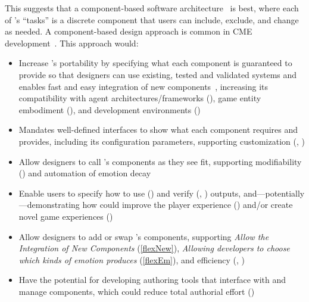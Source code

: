 This suggests that a component-based software
architecture~\citep[p.~248--261]{qian2010software} is best, where each of
\progname{}'s ``tasks'' is a discrete component that users can include,
exclude, and change as needed. A component-based design approach is common in
CME development~\citep[p.~141]{osuna2021toward}. This approach would:
\begin{itemize}
    \item Increase \progname{}'s portability by specifying what each component
    is guaranteed to provide so that designers can use existing, tested and
    validated systems and enables fast and easy integration of new
    components~\citep[p.~443]{rodriguez2015computational}, increasing its
    compatibility with agent architectures/frameworks (), game
    entity embodiment (), and development environments
    ()

    \item Mandates well-defined interfaces to show what each component requires
    and provides, including its configuration parameters, supporting
    customization (, )

    \item Allow designers to call \progname{}'s components as they see fit,
    supporting modifiability () and automation of emotion decay

    \item Enable users to specify how to use () and verify
    (, ) \progname{} outputs,
    and---potentially---demonstrating how \progname{} could improve the player
    experience () and/or create novel game experiences
    ()

    \item Allow designers to add or swap \progname{}'s components, supporting
    \textit{Allow the Integration of New Components} (\ref{flexNew}),
    \textit{Allowing developers to choose which kinds of emotion \progname{}
        produces} (\ref{flexEm}), and efficiency (,
        )~\citep[p.~466]{carbone2020radically}

    \item Have the potential for developing authoring tools that interface with
    and manage \progname{} components, which could reduce total authorial
    effort ()
\end{itemize}

